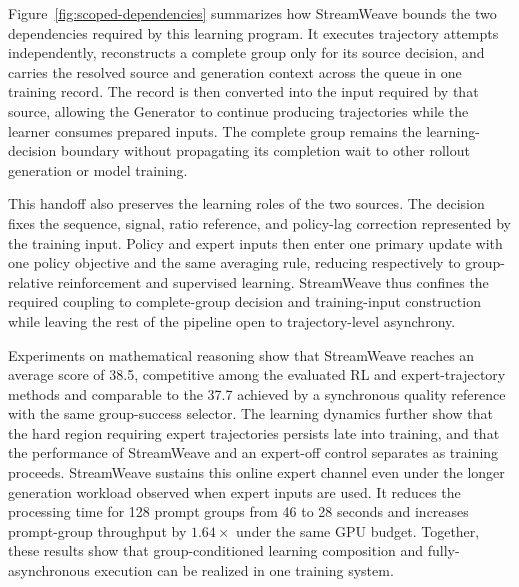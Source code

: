 \documentclass[letterpaper]{article}
\begin{document}
Figure~\ref{fig:scoped-dependencies} summarizes how StreamWeave bounds the two dependencies required by this learning program.
It executes trajectory attempts independently, reconstructs a complete group only for its source decision, and carries the resolved source and generation context across the queue in one training record.
The record is then converted into the input required by that source, allowing the Generator to continue producing trajectories while the learner consumes prepared inputs.
The complete group remains the learning-decision boundary without propagating its completion wait to other rollout generation or model training.

This handoff also preserves the learning roles of the two sources.
The decision fixes the sequence, signal, ratio reference, and policy-lag correction represented by the training input.
Policy and expert inputs then enter one primary update with one policy objective and the same averaging rule, reducing respectively to group-relative reinforcement and supervised learning.
StreamWeave thus confines the required coupling to complete-group decision and training-input construction while leaving the rest of the pipeline open to trajectory-level asynchrony.

Experiments on mathematical reasoning show that StreamWeave reaches an average score of 38.5, competitive among the evaluated RL and expert-trajectory methods and comparable to the 37.7 achieved by a synchronous quality reference with the same group-success selector.
The learning dynamics further show that the hard region requiring expert trajectories persists late into training, and that the performance of StreamWeave and an expert-off control separates as training proceeds.
StreamWeave sustains this online expert channel even under the longer generation workload observed when expert inputs are used.
It reduces the processing time for 128 prompt groups from 46 to 28 seconds and increases prompt-group throughput by $1.64\times$ under the same GPU budget.
Together, these results show that group-conditioned learning composition and fully-asynchronous execution can be realized in one training system.
\end{document}
